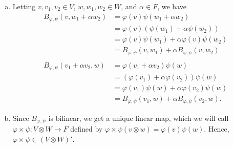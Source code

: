 \documentclass[10pt]{mypackage}
\begin{document}
\begin{solution}\hfill
  \begin{enumerate}[(a)]
    \item Letting $v,v_1,v_2\in V$, $w,w_1,w_2\in W$, and $\alpha\in F$, we have
      \begin{align*}
        B_{\varphi,\psi}\left(v, w_1 + \alpha w_2\right) &= \varphi\left(v\right)\psi\left(w_1 + \alpha w_2\right)\\
                                                         &= \varphi\left(v\right)\left(\psi\left(w_1\right) + \alpha\psi\left(w_2\right)\right)\\
                                                         &= \varphi\left(v\right)\psi\left(w_1\right) + \alpha\varphi\left(v\right)\psi\left(w_2\right)\\
                                                         &= B_{\varphi,\psi}\left(v,w_1\right) + \alpha B_{\varphi,\psi}\left(v,w_2\right)\\
                                                         \\
        B_{\varphi,\psi}\left(v_1 + \alpha v_2,w\right) &= \varphi\left(v_1 + \alpha v_2\right)\psi\left(w\right)\\
                                                        &= \left(\varphi\left(v_1\right) + \alpha\varphi\left(v_2\right)\right)\psi\left(w\right)\\
                                                        &= \varphi\left(v_1\right)\psi\left(w\right) + \alpha\varphi\left(v_2\right)\psi\left(w\right)\\
                                                        &= B_{\varphi,\psi}\left(v_1,w\right) + \alpha B_{\varphi,\psi}\left(v_2,w\right).
      \end{align*}
    \item Since $B_{\varphi,\psi}$ is bilinear, we get a unique linear map, which we will call $\varphi\times \psi: V\otimes W \rightarrow F$ defined by $\varphi\times \psi\left(v\otimes w\right) = \varphi(v)\psi(w)$. Hence, $\varphi\times \psi\in \left(V\otimes W\right)'$.\newline


\end{enumerate}
\end{solution}
\end{document}
